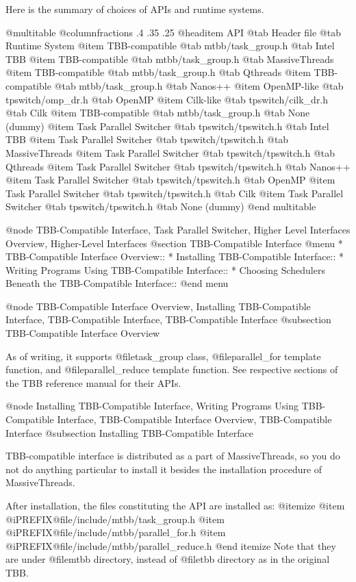 Here is the summary of choices of APIs and runtime systems.

@multitable @columnfractions .4 .35 .25
@headitem API            @tab Header file       @tab Runtime System 
@item     TBB-compatible @tab mtbb/task_group.h @tab Intel TBB 
@item     TBB-compatible @tab mtbb/task_group.h @tab MassiveThreads
@item     TBB-compatible @tab mtbb/task_group.h @tab Qthreads
@item     TBB-compatible @tab mtbb/task_group.h @tab Nanos++
@item     OpenMP-like    @tab tpswitch/omp_dr.h          @tab OpenMP
@item     Cilk-like      @tab tpswitch/cilk_dr.h         @tab Cilk
@item     TBB-compatible @tab mtbb/task_group.h @tab None (dummy)
@item     Task Parallel Switcher @tab tpswitch/tpswitch.h @tab Intel TBB 
@item     Task Parallel Switcher @tab tpswitch/tpswitch.h @tab MassiveThreads
@item     Task Parallel Switcher @tab tpswitch/tpswitch.h @tab Qthreads
@item     Task Parallel Switcher @tab tpswitch/tpswitch.h @tab Nanos++
@item     Task Parallel Switcher @tab tpswitch/tpswitch.h @tab OpenMP
@item     Task Parallel Switcher @tab tpswitch/tpswitch.h @tab Cilk
@item     Task Parallel Switcher @tab tpswitch/tpswitch.h @tab None (dummy)
@end multitable

@node TBB-Compatible Interface, Task Parallel Switcher, Higher Level Interfaces Overview, Higher-Level Interfaces
@section TBB-Compatible Interface
@menu
* TBB-Compatible Interface Overview::
* Installing TBB-Compatible Interface::
* Writing Programs Using TBB-Compatible Interface::
* Choosing Schedulers Beneath the TBB-Compatible Interface::
@end menu

@node TBB-Compatible Interface Overview, Installing TBB-Compatible Interface, TBB-Compatible Interface, TBB-Compatible Interface
@subsection TBB-Compatible Interface Overview

As of writing, it supports @file{task_group} class, @file{parallel_for}
template function, and @file{parallel_reduce} template function.  See
respective sections of the TBB reference manual for their APIs.

@node Installing TBB-Compatible Interface, Writing Programs Using TBB-Compatible Interface, TBB-Compatible Interface Overview, TBB-Compatible Interface
@subsection Installing TBB-Compatible Interface

TBB-compatible interface is distributed as a part of MassiveThreads, so
you do not do anything particular to install it besides the installation
procedure of MassiveThreads.

After installation, the files constituting the API are installed as:
@itemize
@item @i{PREFIX}@file{/include/mtbb/task_group.h}
@item @i{PREFIX}@file{/include/mtbb/parallel_for.h}
@item @i{PREFIX}@file{/include/mtbb/parallel_reduce.h}
@end itemize
Note that they are under @file{mtbb} directory, instead of @file{tbb}
directory as in the original TBB.

